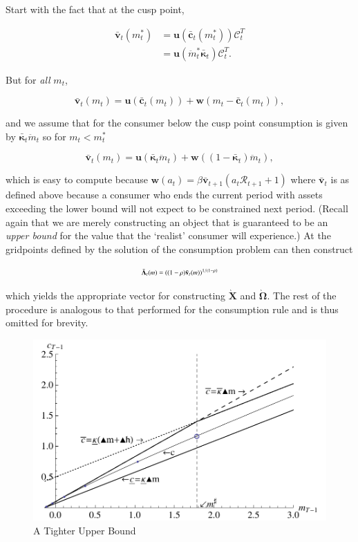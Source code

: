 \documentclass[twocolumn, switch]{article}
\newcommand{\CRRA}{\rho}
\newcommand{\uFunc}{\mathbf{u}}
\newcommand{\DiscFac}{\beta}
\newcommand{\mNrm}{m}
\newcommand{\RNrmByG}{\mathcal{R}}
\newcommand{\aNrm}{a}
\newcommand{\vFunc}{\mathbf{v}}
\newcommand{\cFunc}{\mathbf{c}}
\newcommand{\cFuncOpt}{\bar{\cFunc}}
\newcommand{\MPC}{\boldsymbol{\kappa}}
\newcommand{\mNrmEx}{\ddot{\mNrm}}
\newcommand{\PDVCoverc}{\mathcal{C}}
\newcommand{\vFuncOpt}{\bar{\vFunc}}
\newcommand{\vInv}{{\scriptsize \boldsymbol{\Lambda}}}
\newcommand{\vInvOpt}{\bar{\vInv}}
\newcommand{\valModRte}{\boldsymbol{\Omega}}
\newcommand{\logitValModRte}{\boldsymbol{X}}
\newcommand{\MPCmax}{\bar{\MPC}}
\newcommand{\mNrmCusp}{\mNrm^*}
\newcommand{\mNrmCuspEx}{\ddot{\mNrm}^*}
\newcommand{\wFuncCont}{\mathbf{w}}
\newcommand{\logitValModRteApprox}{\grave{\logitValModRte}}
\newcommand{\valModRteApprox}{\grave{\valModRte}}
\begin{document}
Start with the fact that at the cusp point,

\begin{equation}
\begin{aligned}
\vFuncOpt_{t}(\mNrmCusp_{t}) &= \uFunc(\cFuncOpt_{t}(\mNrmCusp_{t}))\PDVCoverc_{t}^{T} \\
&=  \uFunc(\mNrmCuspEx_{t} \MPCmax_{t})\PDVCoverc_{t}^{T} .
\end{aligned}
\end{equation}

But for \textit{all} $\mNrm_{t}$,

\begin{equation}
\vFuncOpt_{t}(\mNrm_{t}) = \uFunc(\cFuncOpt_{t}(\mNrm_{t}))+ \wFuncCont(\mNrm_{t}-\cFuncOpt_{t}(\mNrm_{t})),
\end{equation}

and we assume that for the consumer below the cusp point consumption is given by
$\MPCmax_{t} \mNrmEx_{t}$ so for $\mNrm_{t}< \mNrmCusp_{t}$

\begin{equation}
\vFuncOpt_{t}(\mNrm_{t}) = \uFunc( \MPCmax_{t} \mNrmEx_{t})+ \wFuncCont((1-\MPCmax_{t})\mNrmEx_{t}),
\end{equation}

which is easy to compute because
$\wFuncCont(\aNrm_{t}) = \DiscFac \vFuncOpt_{t+1}(\aNrm_{t}\RNrmByG_{t+1}+1)$ where
$\vFuncOpt_{t}$ is as defined above because a consumer who ends the current
period with assets exceeding the lower bound will not expect to be constrained
next period. (Recall again that we are merely constructing an object that is
guaranteed to be an \textit{upper bound} for the value that the `realist' consumer will
experience.) At the gridpoints defined by the solution of the consumption
problem can then construct

\begin{equation}
\vInvOpt_{t}(\mNrm) = ((1-\CRRA)\vFuncOpt_{t}(\mNrm))^{1/(1-\CRRA)}
\end{equation}

which yields the appropriate vector for constructing $\logitValModRteApprox$ and
$\valModRteApprox$. The rest of the procedure is analogous to that performed for the
consumption rule and is thus omitted for brevity.

\begin{figure}[!htbp]
\centering
\includegraphics[width=0.8\linewidth]{files/IntExpFOCInvPesReaOp-7e53934f52256b9d0a62f67919fb1d97.pdf}
\caption[]{A Tighter Upper Bound}
\label{fig:IntExpFOCInvPesReaOptNeed45}
\end{figure}
\end{document}
